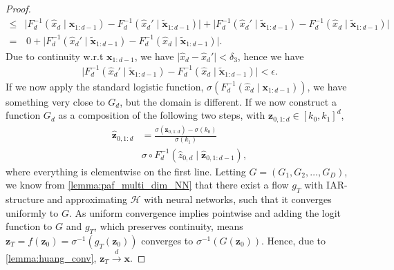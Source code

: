 \begin{proof}
\begin{align*}
        \leq & \lvert F_d^{-1}(\hat{x}_d \mid \bm x_{1:d-1}) - F_d^{-1}(\hat{x}_d' \mid \tilde{\bm x}_{1:d-1})\rvert
        + \lvert F_d^{-1}(\hat{x}_d' \mid \tilde{\bm x}_{1:d-1}) - F_d^{-1}(\hat{x}_d \mid \tilde{\bm x}_{1:d-1})\rvert\\
        =& \, 0 + \lvert F_d^{-1}(\hat{x}_d' \mid \tilde{\bm x}_{1:d-1}) - F_d^{-1}(\hat{x}_d \mid 
        \tilde{\bm x}_{1:d-1})\rvert.
    \end{align*}
    Due to continuity w.r.t \(\bm x_{1:d-1}\), we have  \(\lvert \hat{x}_d - \hat{x}_d'\rvert < \delta_3\), hence we
    have 
    \begin{align*}
        \lvert F_d^{-1}(\hat{x}_d' \mid \tilde{\bm x}_{1:d-1}) - F_d^{-1}(\hat{x}_d \mid 
        \tilde{\bm x}_{1:d-1})\rvert < \epsilon.
    \end{align*}
    If we now apply the standard logistic function, \(\sigma(F_d^{-1}(\hat{x}_d \mid \bm x_{1:d-1}))\), 
    we have something
    very close to \(G_d\), but the domain is different. If we now construct a function \(G_d\) as a composition 
    of the following two steps,
    with \(\bm z_{0,1:d} \in [k_0, k_1]^{d}\),
    \begin{align*}
        \hat{\bm z}_{0,1:d} &= \frac{\sigma(\bm z_{0,1:d}) - \sigma(k_0)}{\sigma(k_1)}\\
                            &\sigma\circ F^{-1}_d(\hat{z}_{0,d} \mid \hat{\bm z}_{0,1:d-1}),
    \end{align*}
    where everything is elementwise on the first line.
    Letting \(G= (G_1,G_2, \dots, G_D)\), we know from \cref{lemma:paf_multi_dim_NN} that there exist 
    a flow \(g_T\) with IAR-structure and approximating \(\mathcal{H}\) with neural networks, 
    such that it converges uniformly to \(G\). As uniform convergence implies pointwise and adding
    the logit function to \(G\) and \(g_T\), which preserves continuity, means 
    \(\bm z_T = f(\bm z_0) = \sigma^{-1}(g_T(\bm z_0))\) converges to \(\sigma^{-1}(G(\bm z_0))\). Hence,
    due to \cref{lemma:huang_conv}, \(\bm z_T \xrightarrow{d} \bm x\).
\end{proof}

